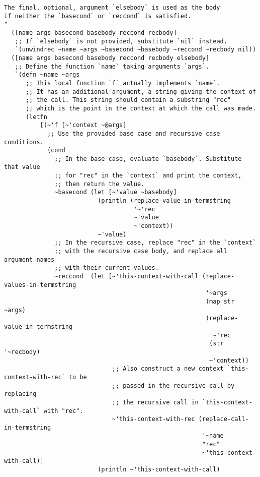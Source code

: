 \documentclass[11pt]{article}
\begin{document}
\begin{verbatim}
The final, optional, argument `elsebody` is used as the body
if neither the `basecond` or `reccond` is satisfied.
"
  ([name args basecond basebody reccond recbody]
   ;; If `elsebody` is not provided, substitute `nil` instead.
   `(unwindrec ~name ~args ~basecond ~basebody ~reccond ~recbody nil))
  ([name args basecond basebody reccond recbody elsebody]
   ;; Define the function `name` taking arguments `args`.
   `(defn ~name ~args
      ;; This local function `f` actually implements `name`.
      ;; It has an additional argument, a string giving the context of
      ;; the call. This string should contain a substring "rec"
      ;; which is the point in the context at which the call was made.
      (letfn
          [(~'f [~'context ~@args]
            ;; Use the provided base case and recursive case conditions.
            (cond
              ;; In the base case, evaluate `basebody`. Substitute that value
              ;; for "rec" in the `context` and print the context,
              ;; then return the value.
              ~basecond (let [~'value ~basebody]
                          (println (replace-value-in-termstring
                                    '~'rec
                                    ~'value
                                    ~'context))
                          ~'value)
              ;; In the recursive case, replace "rec" in the `context`
              ;; with the recursive case body, and replace all argument names
              ;; with their current values.
              ~reccond  (let [~'this-context-with-call (replace-values-in-termstring
                                                        '~args
                                                        (map str ~args)
                                                        (replace-value-in-termstring
                                                         '~'rec
                                                         (str '~recbody)
                                                         ~'context))
                              ;; Also construct a new context `this-context-with-rec` to be
                              ;; passed in the recursive call by replacing
                              ;; the recursive call in `this-context-with-call` with "rec".
                              ~'this-context-with-rec (replace-call-in-termstring
                                                       '~name
                                                       "rec"
                                                       ~'this-context-with-call)]
                          (println ~'this-context-with-call)

\end{verbatim}
\end{document}
